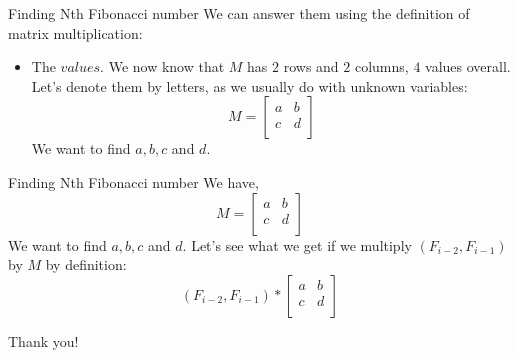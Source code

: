 \documentclass{beamer}
\begin{document}
\begin{frame}{Finding Nth Fibonacci number}
  We can answer them using the definition of matrix multiplication: \newline
  \begin{itemize}
    \item The $values$. \newline \pause
      We now know that $M$ has $2$ rows and $2$ columns, $4$ values overall.
      Let’s denote them by letters, as we usually do with unknown variables:
      \newline \newline
        \[
          M = 
          \left[ {
            \begin{array}{cc}
              a & b \\
              c & d \\      
            \end{array} } 
          \right]
        \]
      \pause
      We want to find $a, b, c$ and $d$.
      \newline
  \end{itemize}
\end{frame}

\begin{frame}{Finding Nth Fibonacci number}
  We have, 
  \[
    M = 
    \left[ {
      \begin{array}{cc}
        a & b \\
        c & d \\      
      \end{array} } 
    \right]
  \]
  \pause
  We want to find $a, b, c$ and $d$.
  \newline
  Let's see what we get if we multiply $(F_{i-2}, F_{i-1})$ by $M$ by definition:
  \newline
  \[
    (F_{i-2}, F_{i-1})
    *
    \left[ {
      \begin{array}{cc}
        a & b \\
        c & d \\      
      \end{array} } 
    \right]
  \]
\end{frame}

\begin{frame}{}
		\LARGE{\centerline{Thank you!}}
\end{frame}
\end{document}
